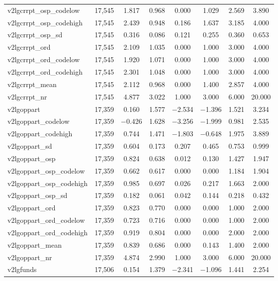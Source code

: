 \begin{table}[!htbp]
\begin{tabular}{@{\extracolsep{5pt}}lccccccc}
v2lgcrrpt\_osp\_codelow & 17,545 & 1.817 & 0.968 & 0.000 & 1.029 & 2.569 & 3.890 \\ 
v2lgcrrpt\_osp\_codehigh & 17,545 & 2.439 & 0.948 & 0.186 & 1.637 & 3.185 & 4.000 \\ 
v2lgcrrpt\_osp\_sd & 17,545 & 0.316 & 0.086 & 0.121 & 0.255 & 0.360 & 0.653 \\ 
v2lgcrrpt\_ord & 17,545 & 2.109 & 1.035 & 0.000 & 1.000 & 3.000 & 4.000 \\ 
v2lgcrrpt\_ord\_codelow & 17,545 & 1.920 & 1.071 & 0.000 & 1.000 & 3.000 & 4.000 \\ 
v2lgcrrpt\_ord\_codehigh & 17,545 & 2.301 & 1.048 & 0.000 & 1.000 & 3.000 & 4.000 \\ 
v2lgcrrpt\_mean & 17,545 & 2.112 & 0.968 & 0.000 & 1.400 & 2.857 & 4.000 \\ 
v2lgcrrpt\_nr & 17,545 & 4.877 & 3.022 & 1.000 & 3.000 & 6.000 & 20.000 \\ 
v2lgoppart & 17,359 & 0.160 & 1.577 & $-$2.534 & $-$1.396 & 1.521 & 3.234 \\ 
v2lgoppart\_codelow & 17,359 & $-$0.426 & 1.628 & $-$3.256 & $-$1.999 & 0.981 & 2.535 \\ 
v2lgoppart\_codehigh & 17,359 & 0.744 & 1.471 & $-$1.803 & $-$0.648 & 1.975 & 3.889 \\ 
v2lgoppart\_sd & 17,359 & 0.604 & 0.173 & 0.207 & 0.465 & 0.753 & 0.999 \\ 
v2lgoppart\_osp & 17,359 & 0.824 & 0.638 & 0.012 & 0.130 & 1.427 & 1.947 \\ 
v2lgoppart\_osp\_codelow & 17,359 & 0.662 & 0.617 & 0.000 & 0.000 & 1.184 & 1.904 \\ 
v2lgoppart\_osp\_codehigh & 17,359 & 0.985 & 0.697 & 0.026 & 0.217 & 1.663 & 2.000 \\ 
v2lgoppart\_osp\_sd & 17,359 & 0.182 & 0.061 & 0.042 & 0.144 & 0.218 & 0.432 \\ 
v2lgoppart\_ord & 17,359 & 0.823 & 0.770 & 0.000 & 0.000 & 1.000 & 2.000 \\ 
v2lgoppart\_ord\_codelow & 17,359 & 0.723 & 0.716 & 0.000 & 0.000 & 1.000 & 2.000 \\ 
v2lgoppart\_ord\_codehigh & 17,359 & 0.919 & 0.804 & 0.000 & 0.000 & 2.000 & 2.000 \\ 
v2lgoppart\_mean & 17,359 & 0.839 & 0.686 & 0.000 & 0.143 & 1.400 & 2.000 \\ 
v2lgoppart\_nr & 17,359 & 4.874 & 2.990 & 1.000 & 3.000 & 6.000 & 20.000 \\ 
v2lgfunds & 17,506 & 0.154 & 1.379 & $-$2.341 & $-$1.096 & 1.441 & 2.254 \\ 

\end{tabular}
\end{table}
